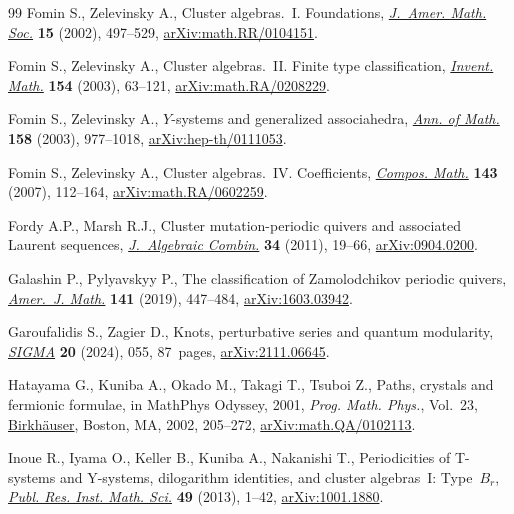 \documentclass[10pt,a4paper]{amsart}
\numberwithin{equation}{section}
\theoremstyle{definition}
\begin{document}
\begin{thebibliography}{99}
Fomin S., Zelevinsky A., Cluster algebras.~{I}. {F}oundations,
 \href{https://doi.org/10.1090/S0894-0347-01-00385-X}{\textit{J.~Amer. Math.
 Soc.}} \textbf{15} (2002), 497--529,
 \href{http://arxiv.org/abs/math.RR/0104151}{arXiv:math.RR/0104151}.

Fomin S., Zelevinsky A., Cluster algebras.~{II}. {F}inite type classification,
 \href{https://doi.org/10.1007/s00222-003-0302-y}{\textit{Invent. Math.}}
 \textbf{154} (2003), 63--121,
 \href{http://arxiv.org/abs/math.RA/0208229}{arXiv:math.RA/0208229}.

Fomin S., Zelevinsky A., {$Y$}-systems and generalized associahedra,
 \href{https://doi.org/10.4007/annals.2003.158.977}{\textit{Ann. of Math.}}
 \textbf{158} (2003), 977--1018,
 \href{http://arxiv.org/abs/hep-th/0111053}{arXiv:hep-th/0111053}.

Fomin S., Zelevinsky A., Cluster algebras.~{IV}. {C}oefficients,
 \href{https://doi.org/10.1112/S0010437X06002521}{\textit{Compos. Math.}}
 \textbf{143} (2007), 112--164,
 \href{http://arxiv.org/abs/math.RA/0602259}{arXiv:math.RA/0602259}.

Fordy A.P., Marsh R.J., Cluster mutation-periodic quivers and associated
 {L}aurent sequences,
 \href{https://doi.org/10.1007/s10801-010-0262-4}{\textit{J.~Algebraic
 Combin.}} \textbf{34} (2011), 19--66,
 \href{http://arxiv.org/abs/0904.0200}{arXiv:0904.0200}.

Galashin P., Pylyavskyy P., The classification of {Z}amolodchikov periodic
 quivers, \href{https://doi.org/10.1353/ajm.2019.0010}{\textit{Amer.~J.
 Math.}} \textbf{141} (2019), 447--484,
 \href{http://arxiv.org/abs/1603.03942}{arXiv:1603.03942}.

Garoufalidis S., Zagier D., Knots, perturbative series and quantum modularity,
 \href{https://doi.org/10.3842/SIGMA.2024.055}{\textit{SIGMA}} \textbf{20}
 (2024), 055, 87~pages,
 \href{http://arxiv.org/abs/2111.06645}{arXiv:2111.06645}.

Hatayama G., Kuniba A., Okado M., Takagi T., Tsuboi Z., Paths, crystals and
 fermionic formulae, in Math{P}hys {O}dyssey, 2001, \textit{Prog. Math.
 Phys.}, Vol.~23,
 \href{https://doi.org/10.1007/978-1-4612-0087-1_9}{Birkh\"auser}, Boston, MA,
 2002, 205--272,
 \href{http://arxiv.org/abs/math.QA/0102113}{arXiv:math.QA/0102113}.

Inoue R., Iyama O., Keller B., Kuniba A., Nakanishi T., Periodicities of
 {T}-systems and {Y}-systems, dilogarithm identities, and cluster
 algebras~{I}: {T}ype~{$B_r$},
 \href{https://doi.org/10.4171/PRIMS/95}{\textit{Publ. Res. Inst. Math. Sci.}}
 \textbf{49} (2013), 1--42,
 \href{http://arxiv.org/abs/1001.1880}{arXiv:1001.1880}.


\end{thebibliography}
\end{document}
